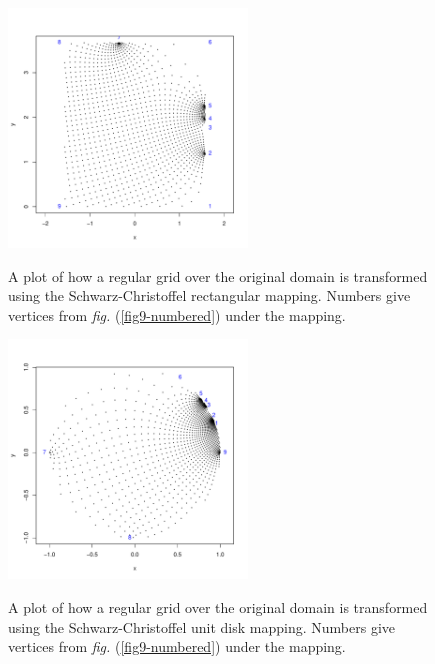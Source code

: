 \documentclass[a4paper,10pt]{amsart}
\newcommand{\sch}{Schwarz-Christoffel }
\newcommand{\fig}[1]{\emph{fig.} (\ref{#1})}
\begin{document}
\begin{figure}[tbp]
\centering
\includegraphics[width=2.5in]{figs-otherdomains/fig9-pointplot-rect.pdf} \\
\caption{A plot of how a regular grid over the original domain is transformed using the \sch rectangular mapping. Numbers give vertices from \fig{fig9-numbered} under the mapping.}
\label{fig9-rect-bunching}
\end{figure}


\begin{figure}[tbp]
\centering
\includegraphics[width=2.5in]{figs-otherdomains/fig9-pointplot-disk.pdf} \\
\caption{A plot of how a regular grid over the original domain is transformed using the \sch unit disk mapping. Numbers give vertices from \fig{fig9-numbered} under the mapping.}
\label{fig9-disk-bunching}
\end{figure}
\end{document}
